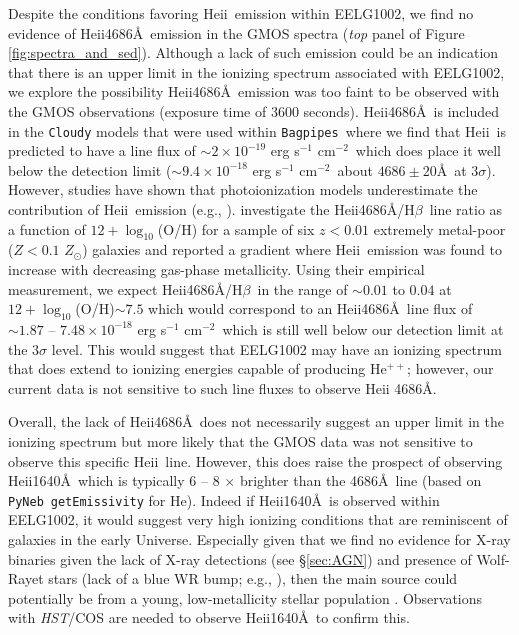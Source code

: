 \documentclass[twocolumn,tight,times,linenumbers]{aastex631}
\newcommand{\hbeta}{H$\beta$}
\newcommand{\heii}{He{\sc ii}}
\newcommand{\cgsline}{erg s$^{-1}$ cm$^{-2}$}
\newcommand{\zsol}{$Z_\odot$}
\newcommand{\pyneb}{\texttt{PyNeb}}
\newcommand{\bagpipes}{\texttt{Bagpipes}}
\begin{document}
		Despite the conditions favoring \heii~emission within EELG1002, we find no evidence of \heii4686\AA~emission in the GMOS spectra (\textit{top} panel of Figure \ref{fig:spectra_and_sed}). Although a lack of such emission could be an indication that there is an upper limit in the ionizing spectrum associated with EELG1002, we explore the possibility \heii4686\AA~emission was too faint to be observed with the GMOS observations (exposure time of 3600 seconds). \heii4686\AA~is included in the \texttt{Cloudy} models that were used within \bagpipes~where we find that \heii~is predicted to have a line flux of $\sim 2\times10^{-19}$ \cgsline~which does place it well below the detection limit ($\sim9.4\times10^{-18}$ \cgsline~about $4686\pm20$\AA~at $3\sigma$). However, studies have shown that photoionization models underestimate the contribution of \heii~emission (e.g., \citealt{Nanayakkara2019,Berg2021}). \cite{Senchyna2019} investigate the \heii4686\AA/\hbeta~line ratio as a function of $12+\log_{10}$(O/H) for a sample of six $z < 0.01$ extremely metal-poor ($Z < 0.1$ \zsol) galaxies and reported a gradient where \heii~emission was found to increase with decreasing gas-phase metallicity. Using their empirical measurement, we expect \heii4686\AA/\hbeta~in the range of $\sim 0.01$ to $0.04$ at $12+\log_{10}$(O/H)$\sim 7.5$ which would correspond to an \heii4686\AA~line flux of $\sim 1.87$ -- $7.48 \times 10^{-18}$ \cgsline~which is still well below our detection limit at the $3\sigma$ level. This would suggest that EELG1002 may have an ionizing spectrum that does extend to ionizing energies capable of producing He$^{++}$; however, our current data is not sensitive to such line fluxes to observe He{\sc ii} 4686\AA. 

		Overall, the lack of He{\sc ii}4686\AA~does not necessarily suggest an upper limit in the ionizing spectrum but more likely that the GMOS data was not sensitive to observe this specific \heii~line. However, this does raise the prospect of observing \heii1640\AA~which is typically 6 -- 8 $\times$ brighter than the 4686\AA~line (based on \pyneb~\texttt{getEmissivity} for He). Indeed if He{\sc ii}1640\AA~is observed within EELG1002, it would suggest very high ionizing conditions that are reminiscent of galaxies in the early Universe. Especially given that we find no evidence for X-ray binaries given the lack of X-ray detections (see \S\ref{sec:AGN}) and presence of Wolf-Rayet stars (lack of a blue WR bump; e.g., \citealt{Guseva2000}), then the main source could potentially be from a young, low-metallicity stellar population \citep{Saxena2020}. Observations with \textit{HST}/COS are needed to observe He{\sc ii}1640\AA~to confirm this.
		
\end{document}
